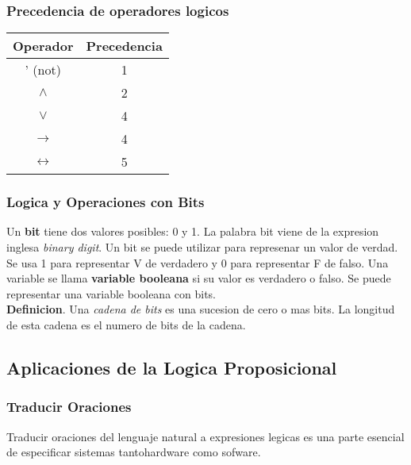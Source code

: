 \documentclass[]{article}
\begin{document}
\subsubsection*{Precedencia de operadores logicos}\label{sec:precedenda}

\begin{table}[H]
	\begin{center}
		\label{tab:precedencia}
		\begin{tabular}{c|c}
		Operador & Precedencia \\
		\hline
		' (not) & 1 \\
		$\wedge$ & 2 \\
		$\vee$ & 4 \\
		$\rightarrow$ & 4 \\
		$\leftrightarrow$ & 5 \\
		\end{tabular}
	\end{center}
\end{table}

\subsubsection*{Logica y Operaciones con Bits}\label{sec:operaciones-bits}

Un \textbf{bit} tiene dos valores posibles: 0 y 1. La palabra bit viene de la expresion inglesa \textit{binary digit}. Un bit se puede utilizar para represenar un valor de verdad. Se usa 1 para representar V de verdadero y 0 para representar F de falso. Una variable se llama \textbf{variable booleana} si su valor es verdadero o falso. Se puede representar una variable booleana con bits.\\

\textbf{Definicion}. Una \textit{cadena de bits} es una sucesion de cero o mas bits. La longitud de esta cadena es el numero de bits de la cadena.

\subsection{Aplicaciones de la Logica Proposicional}

\subsubsection*{Traducir Oraciones}

Traducir oraciones del lenguaje natural a expresiones legicas es una parte esencial de especificar sistemas tantohardware como sofware.
\end{document}
